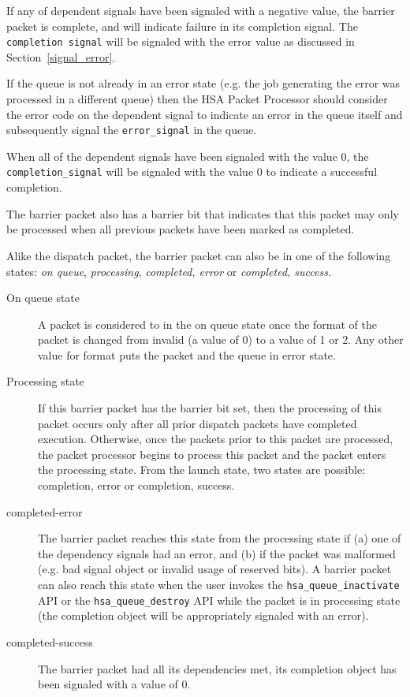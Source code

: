

If any of dependent signals have been signaled with a negative
value, the barrier packet is complete, and will indicate failure in
its completion signal. The \texttt{completion signal} will be
signaled with the error value as discussed in
Section~\ref{signal_error}.

If the queue is not already in an error state (e.g. the job
generating the error was processed in a different queue) then the
HSA Packet Processor should consider the error code on the dependent
signal to indicate an error in the queue itself and subsequently
signal the \texttt{error\_signal} in the queue.

When all of the dependent signals have been signaled with the value
0, the \texttt{completion\_signal} will be signaled with the value 0 to
indicate a successful completion.

The barrier packet also has a barrier bit that indicates that this
packet may only be processed when all previous packets have been
marked as completed.

Alike the dispatch packet, the barrier packet can also be in one of
the following states: \emph{on queue}, \emph{processing},
\emph{completed, error} or \emph{completed, success}.

\begin{description}

\item[On queue state] A packet is considered to in the on queue
state once the format of the packet is changed from invalid (a value
of 0) to a value of 1 or 2. Any other value for format puts the
packet and the queue in error state.

\item[Processing state] If this barrier packet has the barrier bit set,
then the processing of this packet occurs only after all prior
dispatch packets have completed execution.  Otherwise, once the
packets prior to this packet are processed, the packet processor
begins to process this packet and the packet enters the processing
state.  From the launch state, two states are possible: completion,
error or completion, success.

\item[completed-error] The barrier packet reaches this state from
the processing state if (a) one of the dependency signals had an
error, and (b) if the packet was malformed (e.g. bad signal object
or invalid usage of reserved bits). A barrier packet can also reach
this state when the user invokes the
\texttt{hsa\_queue\_inactivate} API or the
\texttt{hsa\_queue\_destroy} API while the packet is in processing
state (the completion object will be appropriately signaled with an
error).

\item[completed-success] The barrier packet had all its dependencies
met, its completion object has been signaled with a value of 0.

\end{description}

